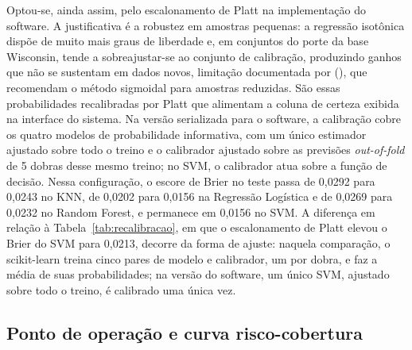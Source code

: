 \documentclass[
    12pt
    ,oneside
    ,a4paper
    ,chapter=TITLE
    ,section=TITLE
    ,sumario=abnt-6027-2012
    ,english,brazil]{abntex2} %
\begin{document}
Optou-se, ainda assim, pelo escalonamento de Platt na implementação do software.
A justificativa é a robustez em amostras pequenas: a regressão isotônica dispõe
de muito mais graus de liberdade e, em conjuntos do porte da base Wisconsin,
tende a sobreajustar-se ao conjunto de calibração, produzindo ganhos que não se
sustentam em dados novos, limitação documentada por
 (\citeyear{NiculescuMizil2005}), que
recomendam o método sigmoidal para amostras reduzidas. São essas probabilidades
recalibradas por Platt que alimentam a coluna de certeza exibida na interface do
sistema. Na versão serializada para o software, a calibração cobre os quatro
modelos de probabilidade informativa, com um único estimador ajustado sobre
todo o treino e o calibrador ajustado sobre as previsões \textit{out-of-fold}
de 5 dobras desse mesmo treino; no SVM, o calibrador atua sobre a função de
decisão. Nessa configuração, o escore de Brier no teste passa
de 0,0292 para 0,0243 no KNN, de 0,0202 para 0,0156 na Regressão Logística e de
0,0269 para 0,0232 no Random Forest, e permanece em 0,0156 no SVM. A diferença
em relação à Tabela~\ref{tab:recalibracao}, em que o escalonamento de Platt
elevou o Brier do SVM para 0,0213, decorre da forma de ajuste: naquela
comparação, o scikit-learn treina cinco pares de modelo e calibrador, um por
dobra, e faz a média de suas probabilidades; na versão do software, um único
SVM, ajustado sobre todo o treino, é calibrado uma única vez.

\subsection{Ponto de operação e curva risco-cobertura}
\label{subsec:ponto-operacao}
\end{document}
